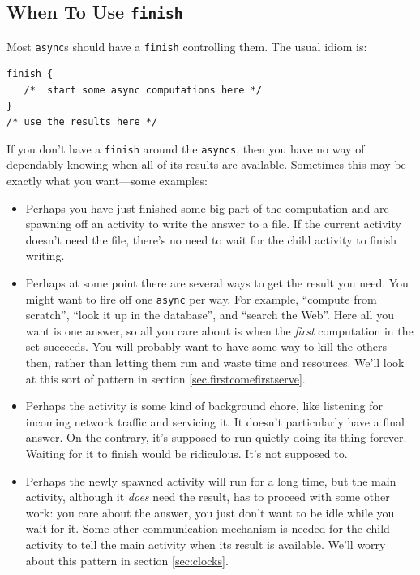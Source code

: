 \subsection{When To Use {\tt finish}}\label{ssec:whenusefinish}

Most {\tt async}s should have a {\tt finish} controlling them.
The usual idiom is: 
\begin{verbatim}
finish {
   /*  start some async computations here */
}
/* use the results here */
\end{verbatim}

If you don't have a {\tt finish} around the {\tt asyncs}, then you have no way of
dependably knowing when all of its results are available.
Sometimes this may be exactly what you want---some examples:

\begin{itemize}
\item Perhaps you have just finished some big part of the computation and are
      spawning off an activity to write the answer to a file. If the current activity
      doesn't need the file, there's no need
      to wait for the child activity to finish writing.

\item Perhaps at some point there are several ways to get the result you need.
	You might want to fire off one {\tt async} per way.  For example, ``compute from
	scratch'', ``look it up in the database'', and ``search the Web''.
	Here all you want is one  answer, so all you care about is when the {\em first}
	computation in the set succeeds.  You will probably want to have some way
       to kill the others then, rather than letting them run and
       waste time and resources.   We'll look at this sort of pattern in section
      \ref{sec.firstcomefirstserve}.

\item Perhaps the activity is some kind of background chore, like listening
	for incoming network traffic and servicing it.  It doesn't particularly have
	a final answer.  On the contrary, it's supposed to run quietly doing its
	thing forever.  Waiting for it to finish would be ridiculous.  It's not supposed to.

\item Perhaps the newly spawned activity will run for a long time, but the main 
      activity, although it {\em does} need the result, has to proceed with some
      other work: you care  about the answer, you just don't want to be idle
      while you wait for it.  Some other communication mechanism is needed
      for the child activity to tell the
      main activity when its result is available.  We'll worry about
      this pattern in section \ref{sec:clocks}.
\end{itemize}

